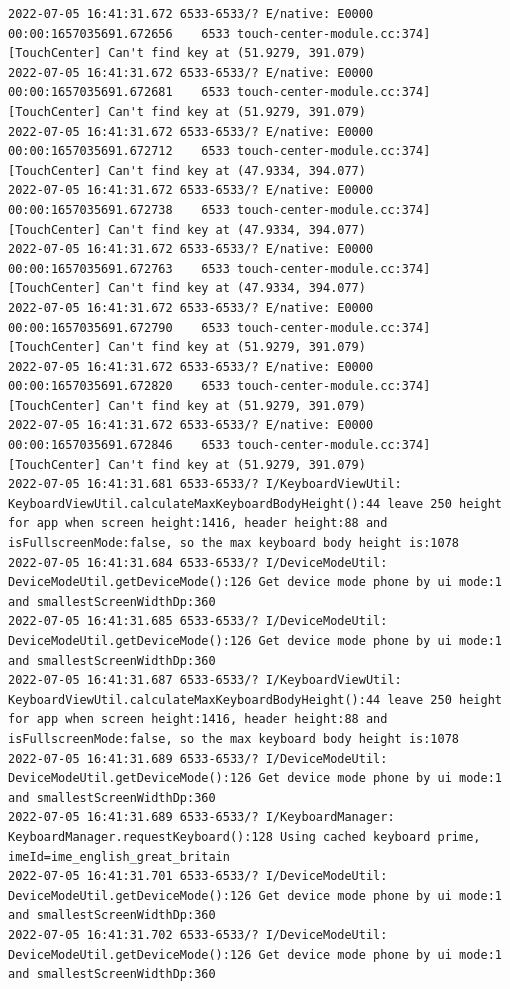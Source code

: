 \documentclass[a4paper,12pt]{book}
\begin{document}
\begin{lstlisting}
2022-07-05 16:41:31.672 6533-6533/? E/native: E0000 00:00:1657035691.672656    6533 touch-center-module.cc:374] [TouchCenter] Can't find key at (51.9279, 391.079)
2022-07-05 16:41:31.672 6533-6533/? E/native: E0000 00:00:1657035691.672681    6533 touch-center-module.cc:374] [TouchCenter] Can't find key at (51.9279, 391.079)
2022-07-05 16:41:31.672 6533-6533/? E/native: E0000 00:00:1657035691.672712    6533 touch-center-module.cc:374] [TouchCenter] Can't find key at (47.9334, 394.077)
2022-07-05 16:41:31.672 6533-6533/? E/native: E0000 00:00:1657035691.672738    6533 touch-center-module.cc:374] [TouchCenter] Can't find key at (47.9334, 394.077)
2022-07-05 16:41:31.672 6533-6533/? E/native: E0000 00:00:1657035691.672763    6533 touch-center-module.cc:374] [TouchCenter] Can't find key at (47.9334, 394.077)
2022-07-05 16:41:31.672 6533-6533/? E/native: E0000 00:00:1657035691.672790    6533 touch-center-module.cc:374] [TouchCenter] Can't find key at (51.9279, 391.079)
2022-07-05 16:41:31.672 6533-6533/? E/native: E0000 00:00:1657035691.672820    6533 touch-center-module.cc:374] [TouchCenter] Can't find key at (51.9279, 391.079)
2022-07-05 16:41:31.672 6533-6533/? E/native: E0000 00:00:1657035691.672846    6533 touch-center-module.cc:374] [TouchCenter] Can't find key at (51.9279, 391.079)
2022-07-05 16:41:31.681 6533-6533/? I/KeyboardViewUtil: KeyboardViewUtil.calculateMaxKeyboardBodyHeight():44 leave 250 height for app when screen height:1416, header height:88 and isFullscreenMode:false, so the max keyboard body height is:1078
2022-07-05 16:41:31.684 6533-6533/? I/DeviceModeUtil: DeviceModeUtil.getDeviceMode():126 Get device mode phone by ui mode:1 and smallestScreenWidthDp:360
2022-07-05 16:41:31.685 6533-6533/? I/DeviceModeUtil: DeviceModeUtil.getDeviceMode():126 Get device mode phone by ui mode:1 and smallestScreenWidthDp:360
2022-07-05 16:41:31.687 6533-6533/? I/KeyboardViewUtil: KeyboardViewUtil.calculateMaxKeyboardBodyHeight():44 leave 250 height for app when screen height:1416, header height:88 and isFullscreenMode:false, so the max keyboard body height is:1078
2022-07-05 16:41:31.689 6533-6533/? I/DeviceModeUtil: DeviceModeUtil.getDeviceMode():126 Get device mode phone by ui mode:1 and smallestScreenWidthDp:360
2022-07-05 16:41:31.689 6533-6533/? I/KeyboardManager: KeyboardManager.requestKeyboard():128 Using cached keyboard prime, imeId=ime_english_great_britain
2022-07-05 16:41:31.701 6533-6533/? I/DeviceModeUtil: DeviceModeUtil.getDeviceMode():126 Get device mode phone by ui mode:1 and smallestScreenWidthDp:360
2022-07-05 16:41:31.702 6533-6533/? I/DeviceModeUtil: DeviceModeUtil.getDeviceMode():126 Get device mode phone by ui mode:1 and smallestScreenWidthDp:360

\end{lstlisting}
\end{document}
